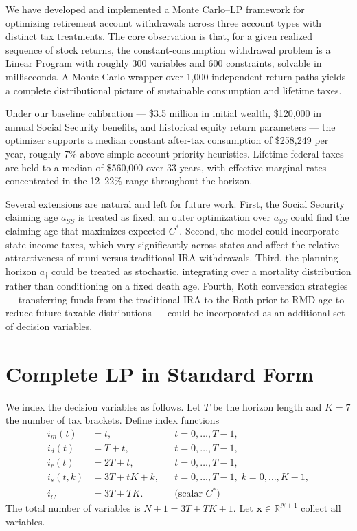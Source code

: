 \documentclass[12pt]{article}
\newcommand{\Copt}{C^{*}}
\begin{document}
We have developed and implemented a Monte Carlo--LP framework for optimizing
retirement account withdrawals across three account types with distinct tax
treatments. The core observation is that, for a given realized sequence of
stock returns, the constant-consumption withdrawal problem is a Linear Program
with roughly 300 variables and 600 constraints, solvable in milliseconds. A
Monte Carlo wrapper over 1,000 independent return paths yields a complete
distributional picture of sustainable consumption and lifetime taxes.

Under our baseline calibration --- \$3.5 million in initial wealth,
\$120,000 in annual Social Security benefits, and historical equity return
parameters --- the optimizer supports a median constant after-tax consumption
of \$258,249 per year, roughly 7\% above simple account-priority heuristics.
Lifetime federal taxes are held to a median of \$560,000 over 33 years, with
effective marginal rates concentrated in the 12--22\% range throughout the
horizon.

Several extensions are natural and left for future work. First, the Social
Security claiming age $a_{SS}$ is treated as fixed; an outer optimization
over $a_{SS}$ could find the claiming age that maximizes expected $\Copt$.
Second, the model could incorporate state income taxes, which vary
significantly across states and affect the relative attractiveness of muni
versus traditional IRA withdrawals. Third, the planning horizon $a_\dagger$
could be treated as stochastic, integrating over a mortality distribution
rather than conditioning on a fixed death age. Fourth, Roth conversion
strategies --- transferring funds from the traditional IRA to the Roth prior
to RMD age to reduce future taxable distributions --- could be incorporated
as an additional set of decision variables.

\clearpage
\appendix

\section{Complete LP in Standard Form}
\label{app:lp}

We index the decision variables as follows. Let $T$ be the horizon length and
$K = 7$ the number of tax brackets. Define index functions
\begin{align*}
  i_m(t)   &= t,              &    &t = 0,\ldots,T-1, \\
  i_d(t)   &= T + t,          &    &t = 0,\ldots,T-1, \\
  i_r(t)   &= 2T + t,         &    &t = 0,\ldots,T-1, \\
  i_s(t,k) &= 3T + tK + k,   &    &t = 0,\ldots,T-1,\; k=0,\ldots,K-1, \\
  i_C      &= 3T + TK.        &    &\text{(scalar } \Copt\text{)}
\end{align*}
The total number of variables is $N + 1 = 3T + TK + 1$.
Let $\mathbf{x} \in \mathbb{R}^{N+1}$ collect all variables.
\end{document}
